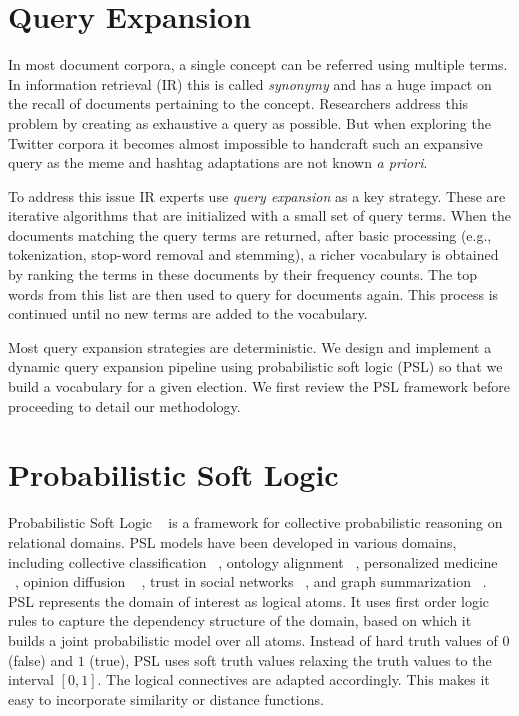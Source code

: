 \section{Query Expansion}
In most document corpora, a single concept can be referred using multiple terms.
In information retrieval (IR) this is called \emph{synonymy} and has a huge impact on the recall of documents pertaining to the concept.
Researchers address this problem by creating as exhaustive a query as possible. 
But when exploring the Twitter corpora it becomes almost impossible to handcraft such an expansive query as the meme and 
hashtag adaptations are not known {\it a priori}.

To address this issue IR experts use \emph{query expansion} as a key strategy.
These are iterative algorithms that are initialized with a small set of query terms. 
When the documents matching the query terms are returned, after basic processing (e.g.,
tokenization, stop-word removal and stemming), a richer vocabulary is obtained by ranking the 
terms in these documents by their frequency counts.
The top words from this list are then used to query for documents again. 
This process is continued until no new terms are added to the vocabulary. 

Most query expansion strategies are deterministic.
We design and implement a dynamic query expansion
pipeline using probabilistic soft logic (PSL) so that
we build a vocabulary for a given election. 
We first review the PSL framework before proceeding to detail our methodology.

\section{Probabilistic Soft Logic}
Probabilistic Soft Logic ~\cite{kimmig2012short} is a framework for collective probabilistic reasoning on relational domains.
PSL models have been developed in various domains, including collective classification ~\cite{broecheler2010computing}, ontology alignment ~\cite{brocheler2012probabilistic}, personalized medicine ~\cite{bach2010decision}, opinion diffusion ~\cite{bach2012scaling} , trust in social networks ~\cite{huang2012probabilistic}, and graph summarization ~\cite{memory2012graph}.
PSL represents the domain of interest as logical atoms.
It uses first order logic rules to capture the dependency structure of the domain, based on which it builds a joint probabilistic model over all atoms.
Instead of hard truth values of $0$ (false) and $1$ (true), PSL uses soft truth values relaxing the truth values to the interval $[0,1]$.
The logical connectives are adapted accordingly.
This makes it easy to incorporate similarity or distance functions.

